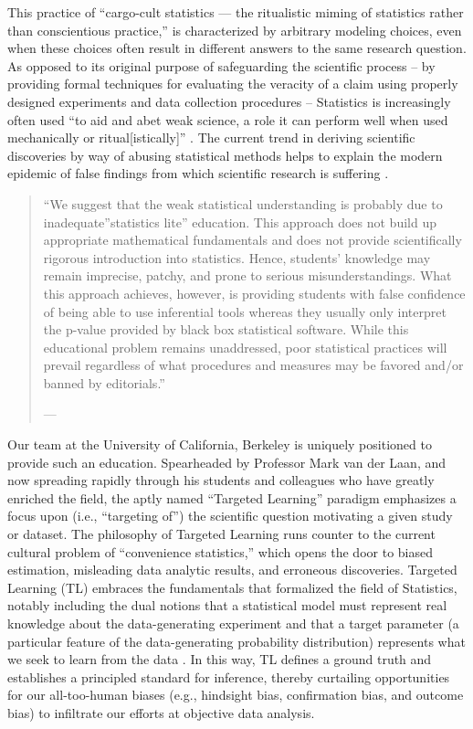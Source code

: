 \documentclass[
  12pt, krantz2,
]{krantz}
\newcommand{\1}{\mathbbm{1}}
\theoremstyle{definition}
\theoremstyle{definition}
\theoremstyle{definition}
\theoremstyle{definition}
\theoremstyle{remark}
\begin{document}
This practice of ``cargo-cult statistics --- the ritualistic miming of statistics
rather than conscientious practice,'' \citep{stark2018cargo} is characterized by
arbitrary modeling choices, even when these choices often result in different
answers to the same research question. As opposed to its original purpose of
safeguarding the scientific process -- by providing formal techniques for
evaluating the veracity of a claim using properly designed experiments and data
collection procedures -- Statistics is increasingly often used ``to aid and abet
weak science, a role it can perform well when used mechanically or
ritual{[}istically{]}'' \citep{stark2018cargo}. The current trend in deriving scientific
discoveries by way of abusing statistical methods helps to explain the modern
epidemic of false findings from which scientific research is suffering
\citep{vdl2014entering}.

\begin{quote}
``We suggest that the weak statistical understanding is probably due to
inadequate''statistics lite'' education. This approach does not build up
appropriate mathematical fundamentals and does not provide scientifically
rigorous introduction into statistics. Hence, students' knowledge may remain
imprecise, patchy, and prone to serious misunderstandings. What this approach
achieves, however, is providing students with false confidence of being able
to use inferential tools whereas they usually only interpret the p-value
provided by black box statistical software. While this educational problem
remains unaddressed, poor statistical practices will prevail regardless of
what procedures and measures may be favored and/or banned by editorials.''

--- \citet{szucs2017null}
\end{quote}

Our team at the University of California, Berkeley is uniquely positioned to
provide such an education. Spearheaded by Professor Mark van der Laan, and
now spreading rapidly through his students and colleagues who have greatly
enriched the field, the aptly named ``Targeted Learning'' paradigm emphasizes a
focus upon (i.e., ``targeting of'') the scientific question motivating a given
study or dataset. The philosophy of Targeted Learning runs counter to the
current cultural problem of ``convenience statistics,'' which opens the door to
biased estimation, misleading data analytic results, and erroneous discoveries.
Targeted Learning (TL) embraces the fundamentals that formalized the field of
Statistics, notably including the dual notions that a statistical model must
represent real knowledge about the data-generating experiment and that a target
parameter (a particular feature of the data-generating probability distribution)
represents what we seek to learn from the data \citep{vdl2014entering}. In this way,
TL defines a ground truth and establishes a principled standard for inference,
thereby curtailing opportunities for our all-too-human biases (e.g., hindsight
bias, confirmation bias, and outcome bias) to infiltrate our efforts at
objective data analysis.
\end{document}

